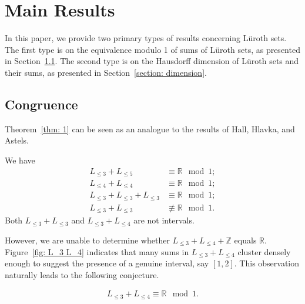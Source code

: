 \documentclass{ws-ijnt}
\begin{document}
	
	\section{Main Results}\label{section: results}
	In this paper, we provide two primary types of results concerning L\"uroth sets. The first type is on the equivalence modulo 1 of sums of L\"uroth sets, as presented in Section~\ref{section: congurence}. The second type is on the Hausdorff dimension of L\"uroth sets and their sums, as presented in Section~\ref{section: dimension}.
	
	\subsection{Congruence}\label{section: congurence}
	Theorem~\ref{thm: 1} can be seen as an analogue to the results of Hall, Hlavka, and Astels.
	\begin{theorem}\label{thm: 1}
		We have
		\begin{align*}
			L_{\leq 3}+L_{\leq 5} &\equiv\mathbb{R}\mod1; \\
			L_{\leq 4}+L_{\leq 4} &\equiv\mathbb{R}\mod1; \\
			L_{\leq 3}+L_{\leq 3}+L_{\leq 3} &\equiv \mathbb{R}\mod1; \\
			L_{\leq 3}+L_{\leq 3} &\not\equiv\mathbb{R}\mod1.
		\end{align*}
		Both $L_{\leq 3}+L_{\leq 3}$ and $L_{\leq 3}+L_{\leq 4}$ are not intervals.
	\end{theorem}
		However, we are unable to determine whether $L_{\leq 3}+L_{\leq 4}+\mathbb{Z}$ equals $\mathbb{R}$. Figure~\ref{fig: L_3 L_4} indicates that many sums in \(L_{\leq 3}+L_{\leq 4}\) cluster densely enough to suggest the presence of a genuine interval, say \([1,2]\). This observation naturally leads to the following conjecture.
	\begin{conjecture}
		\begin{align*}
			L_{\leq 3}+L_{\leq 4} \equiv \mathbb{R} \mod 1.
		\end{align*}
	\end{conjecture}
	
\end{document}
